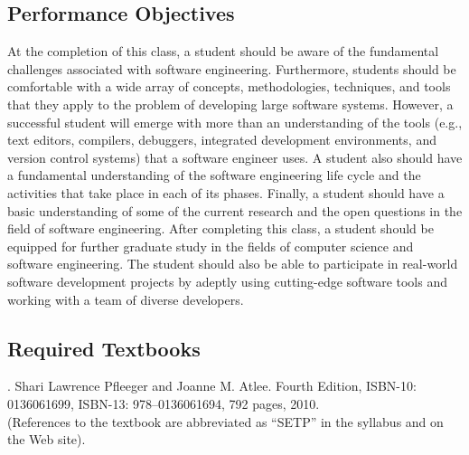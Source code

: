 \documentclass[11pt]{article}
\begin{document}
\subsection*{Performance Objectives}

At the completion of this class, a student should be aware of the fundamental challenges associated with software
engineering. Furthermore, students should be comfortable with a wide array of concepts, methodologies, techniques, and
tools that they apply to the problem of developing large software systems. However, a successful student will emerge
with more than an understanding of the tools (e.g., text editors, compilers, debuggers, integrated development
environments, and version control systems) that a software engineer uses. A student also should have a fundamental
understanding of the software engineering life cycle and the activities that take place in each of its phases. Finally,
a student should have a basic understanding of some of the current research and the open questions in the field of
software engineering. After completing this class, a student should be equipped for further graduate study in the fields
of computer science and software engineering. The student should also be able to participate in real-world software
development projects by adeptly using cutting-edge software tools and working with a team of diverse developers.

\subsection*{Required Textbooks}


. Shari Lawrence Pfleeger and Joanne M. Atlee.
Fourth Edition, ISBN-10: 0136061699, ISBN-13: 978--0136061694, 792 pages, 2010. \\
(References to the textbook are abbreviated as ``SETP'' in the syllabus and on the Web site).

\end{document}
